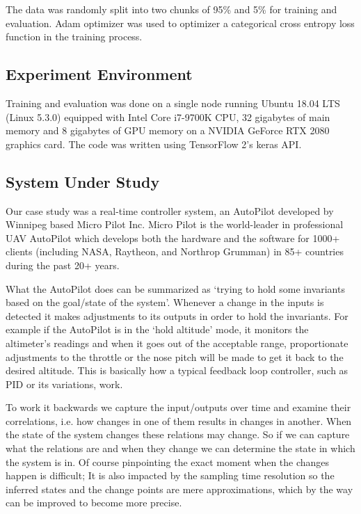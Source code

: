 The data was randomly split into two chunks of 95\% and 5\% for training and evaluation.
Adam optimizer \cite{kingma2014adam} was used to optimizer a categorical cross entropy loss function in the training process.



\subsection{Experiment Environment}
Training and evaluation was done on a single node running Ubuntu 18.04 LTS (Linux 5.3.0) equipped with Intel Core i7-9700K CPU, 32 gigabytes of main memory and 8 gigabytes of GPU memory on a NVIDIA GeForce RTX 2080 graphics card.
The code was written using TensorFlow 2's keras API.



\subsection{System Under Study} \label{mp_data_collection}

Our case study was a real-time controller system, an AutoPilot developed by Winnipeg based Micro Pilot Inc. Micro Pilot is the world-leader in professional UAV AutoPilot which develops both the hardware and the software for 1000+ clients (including NASA, Raytheon, and Northrop Grumman) in 85+ countries during the past 20+ years.

What the AutoPilot does can be summarized as `trying to hold some invariants based on the goal/state of the system'.
Whenever a change in the inputs is detected it makes adjustments to its outputs in order to hold the invariants. 
For example if the AutoPilot is in the `hold altitude' mode, it monitors the altimeter's readings and when it goes out of the acceptable range, proportionate adjustments to the throttle or the nose pitch will be made to get it back to the desired altitude. This is basically how a typical feedback loop controller, such as PID or its variations, work. \cite{feedbacksystemsBook}

\label{changes_in_inputs}
To work it backwards we capture the input/outputs over time and examine their correlations, i.e. how changes in one of them results in changes in another. When the state of the system changes these relations may change. So if we can capture what the relations are and when they change we can determine the state in which the system is in. 
Of course pinpointing the exact moment when the changes happen is difficult; It is also impacted by the sampling time resolution so the inferred states and the change points are mere approximations, which by the way can be improved to become more precise.

